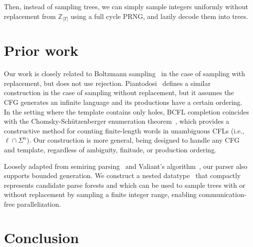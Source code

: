 \documentclass[sigplan,nonacm]{acmart}\settopmatter{printfolios=false,printccs=false,printacmref=false}
\begin{document}
Then, instead of sampling trees, we can simply sample integers uniformly without replacement from $\mathbb{Z}_{|T|}$ using a full cycle PRNG, and lazily decode them into trees.

%
%

  \section{Prior work}

  Our work is closely related to Boltzmann sampling~\cite{duchon2004boltzmann} in the case of sampling with replacement, but does not use rejection. Piantodosi~\cite{piantadosi2023enumerate} defines a similar construction in the case of sampling without replacement, but it assumes the CFG generates an infinite language and its productions have a certain ordering. In the setting where the template contains only holes, BCFL completion coincides with the Chomsky-Sch\"utzenberger enumeration theorem~\cite{panholzer2005grobner}, which provides a constructive method for counting finite-length words in unambiguous CFLs (i.e., $\ell\cap\Sigma^n$). Our construction is more general, being designed to handle any CFG and template, regardless of ambiguity, finitude, or production ordering.

  Loosely adapted from semiring parsing~\cite{goodman1999semiring} and Valiant's algorithm~\cite{valiant1975general}, our parser also supports bounded generation. We construct a nested datatype~\cite{bird1998nested} that compactly represents candidate parse forests and which can be used to sample trees with or without replacement by sampling a finite integer range, enabling communication-free parallelization. %

  \section{Conclusion}
\end{document}
